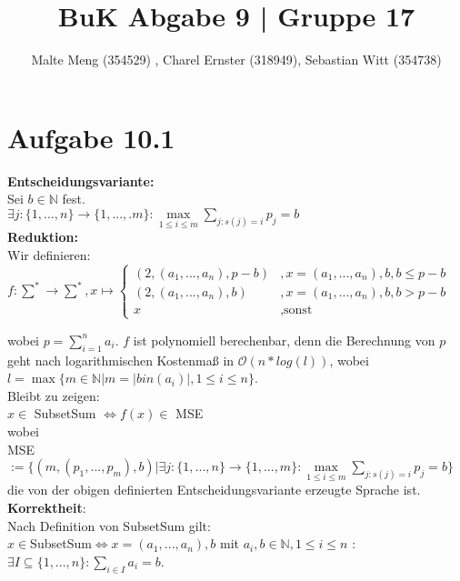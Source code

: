 \documentclass{article}
\title{BuK Abgabe 9 | Gruppe 17}
\author{Malte Meng (354529) , Charel Ernster (318949), Sebastian Witt (354738)}
\begin{document}
	\maketitle 
	\section[a 10.1]{Aufgabe 10.1}
	\textbf{ Entscheidungsvariante:}\\
	
	Sei $b \in \mathbb{N}$ fest.\\
	
	$\exists j:\{1,...,n\}\to\{1,...,.m\}: \max\limits_{1 \leq i \leq m} \sum\limits_{j:s(j)=i} p_j=b$\\
	
\textbf{Reduktion:}	\\

Wir definieren:\\

$f: \sum^* \to \sum^*, x \mapsto \left\{\begin{array}{cl}

(2,(a_1,...,a_n),p-b)& ,x=(a_1,...,a_n),b,b\leq p-b \\ (2,(a_1,...,a_n),b) & , x=(a_1,...,a_n),b,b >p-b \\ x & ,\mbox{sonst} \end{array} \right.$

wobei $p=\sum_{i=1}^n a_i$. $f$ ist polynomiell berechenbar, denn die Berechnung von $p$ geht nach logarithmischen Kostenmaß in $\mathcal{O}(n*log(l))$, wobei $l=\max \{m \in \mathbb{N} | m= \vert bin(a_i) \vert , 1\leq i \leq n\}$.\\
Bleibt zu zeigen:\\

$x \in$ SubsetSum $ \Leftrightarrow f(x) \in$ MSE\\


wobei\\
MSE$:=\{(m,(p_1,...,p_m),b) | \exists j : \{1,...,n\} \to \{1,...,m\}: \max\limits_{1 \leq i \leq m} \sum\limits_{j:s(j)=i} p_j=b \}$\\
die von der obigen definierten Entscheidungsvariante erzeugte Sprache ist.\\

\textbf{Korrektheit}:\\

Nach Definition von SubsetSum gilt:\\
$x \in $SubsetSum$ \Leftrightarrow x=(a_1,...,a_n),b$ mit $a_i,b \in \mathbb{N}, 1\leq i \leq n$ : $\exists I \subseteq \{1,...,n\}:\sum\limits_{i \in I} a_i=b$.\\
\end{document}
